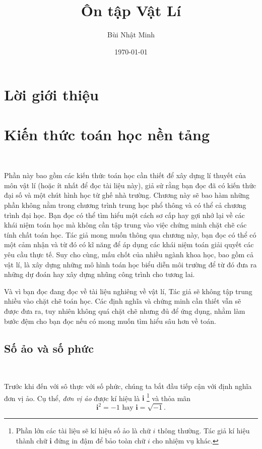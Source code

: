 \documentclass[a4paper, titlepage, openany]{book}
\title{\Huge Ôn tập Vật Lí}
\author{Bùi Nhật Minh}
\date{\today}
\newcommand{\chapdir}{chapter/}
\numberwithin{equation}{chapter}
\begin{document}
\maketitle

\setcounter{chapter}{-1}

\tableofcontents

\chapter*{Lời giới thiệu}

\chapter{Kiến thức toán học nền tảng}

\ %

Phần này bao gồm các kiến thức toán học cần thiết để xây dựng lí thuyết của môn vật lí (hoặc ít nhất để đọc tài liệu này), giả sử rằng bạn đọc đã có kiến thức đại số và một chút hình học từ ghế nhà trường. Chương này sẽ bao hàm những phần không nằm trong chương trình trung học phổ thông và có thể cả chương trình đại học. Bạn đọc có thể tìm hiểu một cách sơ cấp hay gợi nhớ lại về các khái niệm toán học mà không cần tập trung vào việc chứng minh chặt chẽ các tính chất toán học. Tác giả mong muốn thông qua chương này, bạn đọc có thể có một cảm nhận và từ đó có kĩ năng để áp dụng các khái niệm toán giải quyết các yêu cầu thực tế. Suy cho cùng, mấu chốt của nhiều ngành khoa học, bao gồm cả vật lí, là xây dựng những mô hình toán học biểu diễn môi trường để từ đó đưa ra những dự đoán hay xây dựng nhũng công trình cho tương lai.

Và vì bạn đọc đang đọc về tài liệu nghiêng về vật lí, Tác giả sẽ không tập trung nhiều vào chặt chẽ toán học. Các định nghĩa và chứng minh cần thiết vẫn sẽ được đưa ra, tuy nhiên không quá chặt chẽ nhưng đủ để ứng dụng, nhằm làm bước đệm cho bạn đọc nếu có mong muốn tìm hiểu sâu hơn về toán.




 

\section{Số ảo và số phức}

\ %

Trước khi đến với sô thực với số phức, chúng ta bắt đầu tiếp cận với định nghĩa đơn vị ảo. Cụ thể, \emph{đơn vị ảo} được kí hiệu là $\mathbf{i}$ \footnote{Phần lớn các tài liệu sẽ kí hiệu số ảo là chữ $i$ thông thường. Tác giả kí hiệu thành chữ $\mathbf{i}$ đứng in đậm để bảo toàn chữ $i$ cho nhiệm vụ khác.} và thỏa mãn $$\mathbf{i}^2 = -1 \text{ hay } \mathbf{i} = \sqrt{-1}.$$
\end{document}
